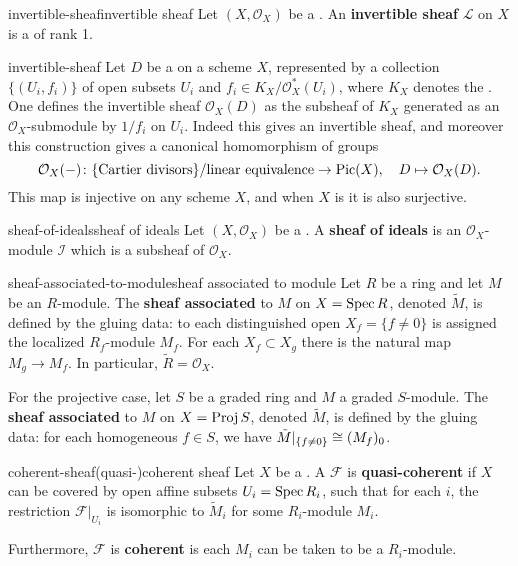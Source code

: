 \begin{topic}{invertible-sheaf}{invertible sheaf}
    Let $(X, \mathcal{O}_X)$ be a . An \textbf{invertible sheaf} $\mathcal{L}$ on $X$ is a   of rank 1.
\end{topic}

\begin{example}{invertible-sheaf}
    Let $D$ be a  on a scheme $X$, represented by a collection $\{ (U_i, f_i) \}$ of open subsets $U_i$ and $f_i \in K_X / \mathcal{O}_X^* (U_i)$, where $K_X$ denotes the . One defines the invertible sheaf $\mathcal{O}_X(D)$ as the subsheaf of $K_X$ generated as an $\mathcal{O}_X$-submodule by $1/f_i$ on $U_i$. Indeed this gives an invertible sheaf, and moreover this construction gives a canonical homomorphism of groups
    \[ \mathcal{O}_X(-) \colon \{ \textup{Cartier divisors} \} / \textup{linear equivalence} \to \textup{Pic}(X), \quad D \mapsto \mathcal{O}_X(D) . \]
    This map is injective on any scheme $X$, and when $X$ is  it is also surjective.
\end{example}

\begin{topic}{sheaf-of-ideals}{sheaf of ideals}
    Let $(X, \mathcal{O}_X)$ be a . A \textbf{sheaf of ideals} is an $\mathcal{O}_X$-module $\mathcal{I}$ which is a subsheaf of $\mathcal{O}_X$.
\end{topic}

\begin{topic}{sheaf-associated-to-module}{sheaf associated to module}
    Let $R$ be a ring and let $M$ be an $R$-module. The \textbf{sheaf associated} to $M$ on $X = \operatorname{Spec} R$, denoted $\tilde{M}$, is defined by the gluing data: to each distinguished open $X_f = \{ f \ne 0 \}$ is assigned the localized $R_f$-module $M_f$. For each $X_f \subset X_g$ there is the natural map $M_g \to M_f$. In particular, $\tilde{R} = \mathcal{O}_X$.
    
    For the projective case, let $S$ be a graded ring and $M$ a graded $S$-module. The \textbf{sheaf associated} to $M$ on $X = \operatorname{Proj} S$, denoted $\tilde{M}$, is defined by the gluing data: for each homogeneous $f \in S$, we have $\tilde{M}|_{\{ f \ne 0\}} \cong (M_f)_0$.
\end{topic}

\begin{topic}{coherent-sheaf}{(quasi-)coherent sheaf}
    Let $X$ be a . A  $\mathcal{F}$ is \textbf{quasi-coherent} if $X$ can be covered by open affine subsets $U_i = \operatorname{Spec} R_i$, such that for each $i$, the restriction $\mathcal{F}|_{U_i}$ is isomorphic to $\tilde{M}_i$ for some $R_i$-module $M_i$.
    
    Furthermore, $\mathcal{F}$ is \textbf{coherent} is each $M_i$ can be taken to be a  $R_i$-module.
\end{topic}

